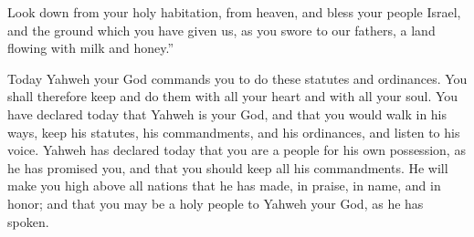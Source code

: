 {Look down from your holy habitation, from heaven, and bless your people Israel, and the ground which you have given us, as you swore to our fathers, a land flowing with milk and honey.”
\par }{\PP {}Today Yahweh your God commands you to do these statutes and ordinances. You shall therefore keep and do them with all your heart and with all your soul.
You have declared today that Yahweh is your God, and that you would walk in his ways, keep his statutes, his commandments, and his ordinances, and listen to his voice.
Yahweh has declared today that you are a people for his own possession, as he has promised you, and that you should keep all his commandments.
He will make you high above all nations that he has made, in praise, in name, and in honor; and that you may be a holy people to Yahweh your God, as he has spoken.

}

